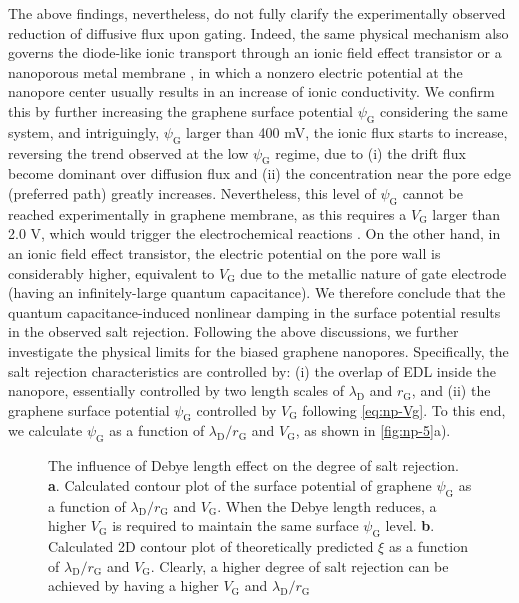 The above findings, nevertheless, do not fully clarify the
experimentally observed reduction of diffusive flux upon
gating. Indeed, the same physical mechanism also governs the {
  diode-like ionic transport through an ionic field effect transistor
  \autocite{Nam_2009_IFET_sub10nm,Lee_2015_sub10nm,Feng_2016_porous_MoS2} or a nanoporous metal membrane
  \autocite{Mccurry_2017_electrolyte_porus_gold}}, in which a nonzero electric
potential at the nanopore center usually results in an increase of
ionic conductivity. We confirm this by further increasing the graphene
surface potential $\psi_{\mathrm{G}}$ considering the same system, and intriguingly, $\psi_{\mathrm{G}}$ larger than 400 mV, the ionic flux
starts to increase, reversing the trend observed at the low
$\psi_{\mathrm{G}}$ regime, due to (i) the drift flux become dominant
over diffusion flux and (ii) the concentration near the pore edge
(preferred path) greatly increases.
Nevertheless, this level of $\psi_{\mathrm{G}}$ cannot be
reached experimentally in graphene membrane, as this requires a
$V_{\mathrm{G}}$ larger than 2.0 V, which would trigger the electrochemical
reactions \autocite{Toh_2011_GO_electrochem}.
%
On the other hand, in an ionic field effect transistor, the electric
potential on the pore wall is considerably higher, equivalent to
$V_{\mathrm{G}}$ due to the metallic nature of gate electrode (having
an infinitely-large quantum capacitance). We therefore conclude that
the quantum capacitance-induced nonlinear damping in the surface
potential results in the observed salt rejection.  Following the above
discussions, we further investigate the physical limits for the biased
graphene nanopores. Specifically, the salt rejection characteristics
are controlled by: (i) the overlap of EDL inside the nanopore,
essentially controlled by two length scales of $\lambda_{\mathrm{D}}$
and $r_{\mathrm{G}}$, and (ii) the graphene surface potential
$\psi_{\mathrm{G}}$ controlled by $V_{\mathrm{G}}$ following
 \autoref{eq:np-Vg}. To this end, we calculate $\psi_{\mathrm{G}}$ as a
function of $\lambda_{\mathrm{D}} / r_{\mathrm{G}}$ and
$V_{\mathrm{G}}$, as shown in  \autoref{fig:np-5}a).
\begin{figure}[!htbp]
  \centering
  \caption{The influence of Debye length effect on the degree of salt
      rejection. \textbf{a}. Calculated contour plot of the surface
    potential of graphene $\psi_{\mathrm{G}}$ as a function of
    $\lambda_{\mathrm{D}}/r_{\mathrm{G}}$ and $V_{\mathrm{G}}$. When
    the Debye length reduces, a higher $V_{\mathrm{G}}$ is required to
    maintain the same surface $\psi_{\mathrm{G}}$
    level. \textbf{b}. Calculated 2D contour plot of theoretically
    predicted $\xi$ as a function of
    $\lambda_{\mathrm{D}}/r_{\mathrm{G}}$ and
    $V_{\mathrm{G}}$. Clearly, a higher degree of salt rejection can
    be achieved by having a higher $V_{\mathrm{G}}$ and
    $\lambda_{\mathrm{D}}/r_{\mathrm{G}}$}
  \label{fig:np-5}
\end{figure}
